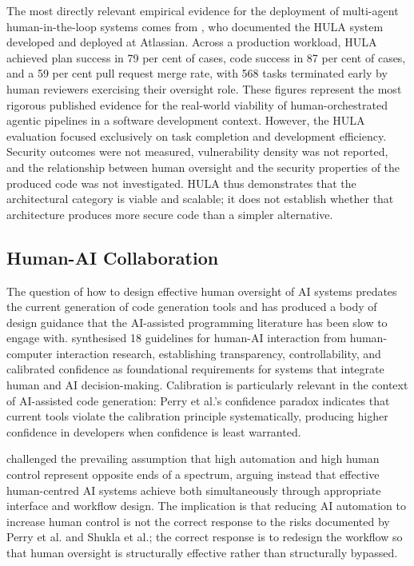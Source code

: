The most directly relevant empirical evidence for the deployment of multi-agent human-in-the-loop systems comes from \citet{takerngsaksiri2025}, who documented the HULA system developed and deployed at Atlassian. Across a production workload, HULA achieved plan success in 79 per cent of cases, code success in 87 per cent of cases, and a 59 per cent pull request merge rate, with 568 tasks terminated early by human reviewers exercising their oversight role. These figures represent the most rigorous published evidence for the real-world viability of human-orchestrated agentic pipelines in a software development context. However, the HULA evaluation focused exclusively on task completion and development efficiency. Security outcomes were not measured, vulnerability density was not reported, and the relationship between human oversight and the security properties of the produced code was not investigated. HULA thus demonstrates that the architectural category is viable and scalable; it does not establish whether that architecture produces more secure code than a simpler alternative.

\subsection{Human-AI Collaboration}

The question of how to design effective human oversight of AI systems predates the current generation of code generation tools and has produced a body of design guidance that the AI-assisted programming literature has been slow to engage with. \citet{amershi2019} synthesised 18 guidelines for human-AI interaction from human-computer interaction research, establishing transparency, controllability, and calibrated confidence as foundational requirements for systems that integrate human and AI decision-making. Calibration is particularly relevant in the context of AI-assisted code generation: Perry et al.'s confidence paradox indicates that current tools violate the calibration principle systematically, producing higher confidence in developers when confidence is least warranted.

\citet{shneiderman2020} challenged the prevailing assumption that high automation and high human control represent opposite ends of a spectrum, arguing instead that effective human-centred AI systems achieve both simultaneously through appropriate interface and workflow design. The implication is that reducing AI automation to increase human control is not the correct response to the risks documented by Perry et al. and Shukla et al.; the correct response is to redesign the workflow so that human oversight is structurally effective rather than structurally bypassed.

